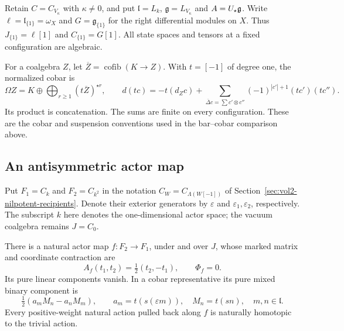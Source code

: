 Retain $C=C_{V_\kappa}$ with $\kappa\ne0$, and put
$\mathfrak l=L_k$, $\mathfrak g=L_{V_\kappa}$ and
$A=U_{\star}\mathfrak g$.
Write $\ell=\mathfrak l_{\{1\}}=\omega_X$ and
$G=\mathfrak g_{\{1\}}$ for the right differential modules on $X$.
Thus $J_{\{1\}}=\ell[1]$ and $C_{\{1\}}=G[1]$.
All state spaces and tensors at a fixed configuration are algebraic.

For a coalgebra $Z$, let $\overline Z=\operatorname{cofib}(K\to Z)$.
With $t=[-1]$ of degree one, the normalized cobar is
\[
 \Omega Z=K\oplus\bigoplus_{r\ge1}(t\overline Z)^{\star r},
 \qquad
 d(tc)=-t(d_Zc)+\sum_{\overline\Delta c=\sum c'\otimes c''}
                  (-1)^{|c'|+1}(tc')(tc'').
\]
Its product is concatenation. The sums are finite on every
configuration. These are the cobar and suspension conventions used
in the bar--cobar comparison above.

\subsection{An antisymmetric actor map}

Put $F_1=C_{k}$ and $F_2=C_{k^2}$ in the notation
$C_W=C_{\Lambda(W[-1])}$ of
Section~\ref{sec:vol2-nilpotent-recipients}.
Denote their exterior generators by $\varepsilon$ and
$\varepsilon_1,\varepsilon_2$, respectively.
The subscript $k$ here denotes the one-dimensional actor space;
the vacuum coalgebra remains $J=C_0$.

\begin{lemma}\label{lem:vol2-antisymmetric-actor}
There is a natural actor map $f:F_2\to F_1$, under and over $J$,
whose marked matrix and coordinate contraction are
\[
 A_f(t_1,t_2)=\tfrac12(t_2,-t_1),\qquad \Phi_f=0.
\]
Its pure linear components vanish. In a cobar representative its
pure mixed binary component is
\begin{equation}\label{eq:vol2-antisymmetric-lift}
 \tfrac12(a_mM_n-a_nM_m),\qquad
 a_m=t(s(\varepsilon m)),\quad M_n=t(sn),\quad m,n\in\mathfrak l.
\end{equation}
Every positive-weight natural action pulled back along $f$ is
naturally homotopic to the trivial action.
\end{lemma}

